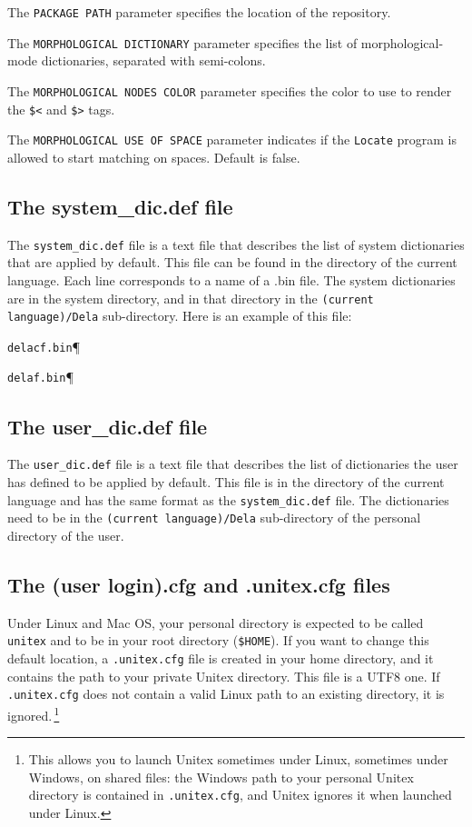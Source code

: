 \bigskip
\noindent The \verb+PACKAGE PATH+ parameter specifies the location of the
repository.

\bigskip
\noindent The \verb+MORPHOLOGICAL DICTIONARY+ parameter specifies the list of
morphological-mode dictionaries, separated with semi-colons.

\bigskip
\noindent The \verb+MORPHOLOGICAL NODES COLOR+ parameter specifies the color
to use to render the \verb+$<+ and \verb+$>+ tags. 

\bigskip
\noindent The \verb+MORPHOLOGICAL USE OF SPACE+ parameter indicates if the
\verb+Locate+ program is allowed to start matching on spaces. Default is false. 


\subsection{The system\_dic.def file}
The \verb+system_dic.def+ file is a text file that describes the list of system
dictionaries that are applied by default. This file can be found in the directory
of the current language. Each line corresponds to a name of a .bin file. The
system dictionaries are in the system directory, and in that directory in the
\verb+(current language)/Dela+ sub-directory.  Here is an
example of this file:


\bigskip
\verb$delacf.bin$\P

\verb$delaf.bin$\P

\subsection{The user\_dic.def file}
The \verb+user_dic.def+ file is a text file that describes the list of
dictionaries the user has defined to be applied by default. This file is in the
directory of the current language and has the same format as the
\verb+system_dic.def+ file. 
The dictionaries need to be in the \verb+(current language)/Dela+ sub-directory of the personal directory of the user.

\subsection{The (user login).cfg and .unitex.cfg files}
Under Linux and Mac OS, your personal directory is expected to be called
\verb+unitex+ and to be in your root directory (\verb+$HOME+). If you want
to change this default location, a \verb+.unitex.cfg+ file is created in your home directory, and
it contains the path to your private Unitex directory. This file is a UTF8 one. If \verb+.unitex.cfg+
does not contain a valid Linux path to an existing directory, it is ignored.\,\footnote{This allows you
to launch Unitex sometimes under Linux, sometimes under Windows, on shared files: the Windows path to your
personal Unitex directory is contained in \texttt{.unitex.cfg}, and Unitex ignores it when launched
under Linux.}

